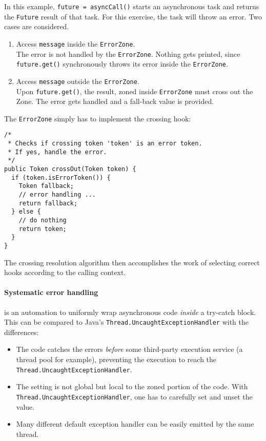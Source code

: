 In this example, \lstinline{future = asyncCall()} starts an asynchronous task and returns the \lstinline{Future} result of that task. For this exercise, the task will throw an error. Two cases are considered.

\begin{enumerate}
\item Access \lstinline{message} inside the \lstinline{ErrorZone}.\\
The error is not handled by the \lstinline{ErrorZone}. Nothing gets printed, since \lstinline{future.get()} synchronously throws its error inside the \lstinline{ErrorZone}.
\item Access \lstinline{message} outside the \lstinline{ErrorZone}.\\
Upon \lstinline{future.get()}, the result, zoned inside \lstinline{ErrorZone} must cross out the Zone. The error gets handled and a fall-back value is provided.
\end{enumerate}

The \lstinline{ErrorZone} simply has to implement the crossing hook:

\begin{lstlisting}
/*
 * Checks if crossing token 'token' is an error token.
 * If yes, handle the error.
 */
public Token crossOut(Token token) {
  if (token.isErrorToken()) {
    Token fallback;
    // error handling ...
    return fallback;
  } else {
    // do nothing
    return token;
  }
}
\end{lstlisting}

The crossing resolution algorithm then accomplishes the work of selecting correct hooks according to the calling context.



\paragraph{Systematic error handling} is an automation to uniformly wrap asynchronous code \emph{inside} a try-catch block. This can be compared to Java's \lstinline{Thread.UncaughtExceptionHandler} with the differences:

\begin{itemize}
\item The code catches the errors \emph{before} some third-party execution service (a thread pool for example), preventing the execution to reach the \lstinline{Thread.UncaughtExceptionHandler}.
\item The setting is not global but local to the zoned portion of the code. With \lstinline{Thread.UncaughtExceptionHandler}, one has to carefully set and unset the value.
\item Many different default exception handler can be easily emitted by the same thread.
\end{itemize}

